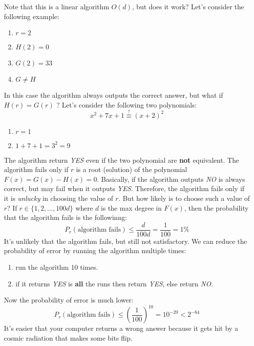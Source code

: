 Note that this is a linear algorithm $O(d)$, but does it work?\newline\newline
Let's consider the following example:
\begin{enumerate}
    \item $r = 2$
    \item $H(2) = 0$
    \item $G(2) = 33$
    \item $G \neq H$
\end{enumerate}
In this case the algorithm always outputs the correct answer, but what if $H(r) = G(r)$ ?\newline\newline
Let's consider the following two polynomials:
\[x^2 + 7x + 1 \stackrel{?}{\equiv} (x + 2)^2\]
\begin{enumerate}
    \item $r = 1$
    \item $1 + 7 + 1 = 3^2 = 9$
\end{enumerate}
The algorithm return \textit{YES} even if the two polynomial are \textbf{not} equivalent.\newline\newline
The algorithm fails only if $r$ is a root (solution) of the polynomial $F(x) = G(x) - H(x) = 0$. Basically, if the algorithm outputs \textit{NO} is always correct, but may fail when it outputs \textit{YES}.\newline\newline
Therefore, the algorithm fails only if it is \textit{unlucky} in choosing the value of $r$. But how likely is to choose such a value of $r$?\newline\newline
If $r \in \{1,2, ..., 100d\}$ where $d$ is the max degree in $F(x)$, then the probability that the algorithm fails is the followinng:
\[P_r(\text{algorithm fails}) \leq \frac{d}{100d} = \frac{1}{100} = 1\%\]
It's unlikely that the algorithm fails, but still not satisfactory. We can reduce the probability of error by running the algorithm multiple times:
\begin{enumerate}
    \item run the algorithm 10 times.
    \item if it returns \textit{YES} is \textbf{all} the runs then return \textit{YES}, else return \textit{NO}.
\end{enumerate}
Now the probability of error is much lower:
\[P_r(\text{algorithm fails}) \leq \left(\frac{1}{100}\right)^{10} = 10 ^{-20} < 2^{-64}\]
It's easier that your computer returns a wrong answer because it gets hit by a cosmic radiation that makes some bits flip. 

